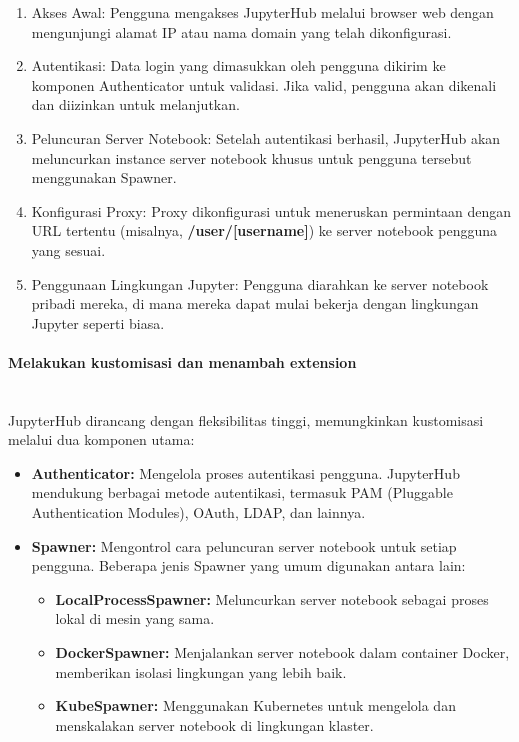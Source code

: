 \begin{enumerate}
\item {Akses Awal:} Pengguna mengakses JupyterHub melalui browser web dengan mengunjungi alamat IP atau nama domain yang telah dikonfigurasi.
\item {Autentikasi:} Data login yang dimasukkan oleh pengguna dikirim ke komponen Authenticator untuk validasi. Jika valid, pengguna akan dikenali dan diizinkan untuk melanjutkan.
\item {Peluncuran Server Notebook:} Setelah autentikasi berhasil, JupyterHub akan meluncurkan instance server notebook khusus untuk pengguna tersebut menggunakan Spawner.
\item {Konfigurasi Proxy:} Proxy dikonfigurasi untuk meneruskan permintaan dengan URL tertentu (misalnya, \textbf{/user/[username]}) ke server notebook pengguna yang sesuai.
\item {Penggunaan Lingkungan Jupyter:} Pengguna diarahkan ke server notebook pribadi mereka, di mana mereka dapat mulai bekerja dengan lingkungan Jupyter seperti biasa.
\end{enumerate}

\paragraph{Melakukan kustomisasi dan menambah extension}\mbox{}\\
JupyterHub dirancang dengan fleksibilitas tinggi, memungkinkan kustomisasi melalui dua komponen utama:

\begin{itemize}
  \item \textbf{Authenticator:} Mengelola proses autentikasi pengguna. JupyterHub mendukung berbagai metode autentikasi, termasuk PAM (Pluggable Authentication Modules), OAuth, LDAP, dan lainnya.
  
  \item \textbf{Spawner:} Mengontrol cara peluncuran server notebook untuk setiap pengguna. Beberapa jenis Spawner yang umum digunakan antara lain:
  \begin{itemize}
    \item \textbf{LocalProcessSpawner:} Meluncurkan server notebook sebagai proses lokal di mesin yang sama.
    \item \textbf{DockerSpawner:} Menjalankan server notebook dalam container Docker, memberikan isolasi lingkungan yang lebih baik.
    \item \textbf{KubeSpawner:} Menggunakan Kubernetes untuk mengelola dan menskalakan server notebook di lingkungan klaster.
  \end{itemize}
\end{itemize}

